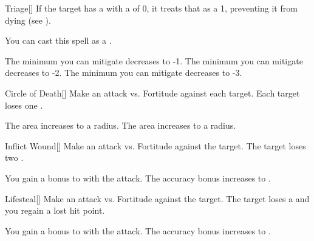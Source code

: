 \lowercase{\hypertarget{spell:Triage}{}}\label{spell:Triage}
\begin{freeability}[Rank 2]{\hypertarget{spell:Triage}{Triage}}[]
If the target has a  with a  of 0, it treats that  as a 1, preventing it from dying (see ).

You can cast this spell as a .

\rankline
{} The minimum  you can mitigate decreases to -1.
 The minimum  you can mitigate decreases to -2.
 The minimum  you can mitigate decreases to -3.

\end{freeability}
\vspace{0.25em}



\lowercase{\hypertarget{spell:Circle of Death}{}}\label{spell:Circle of Death}
\begin{freeability}[Rank 3]{\hypertarget{spell:Circle of Death}{Circle of Death}}[]
Make an attack vs. Fortitude against each target.
\hit Each target loses one .

\rankline
{} The area increases to a \arealarge radius.
 The area increases to a \areahuge radius.

\end{freeability}
\vspace{0.25em}



\lowercase{\hypertarget{spell:Inflict Wound}{}}\label{spell:Inflict Wound}
\begin{freeability}[Rank 3]{\hypertarget{spell:Inflict Wound}{Inflict Wound}}[]
Make an attack vs. Fortitude against the target.
\hit The target loses two .

\rankline
{} You gain a  bonus to  with the attack.
 The accuracy bonus increases to .

\end{freeability}
\vspace{0.25em}



\lowercase{\hypertarget{spell:Lifesteal}{}}\label{spell:Lifesteal}
\begin{freeability}[Rank 3]{\hypertarget{spell:Lifesteal}{Lifesteal}}[]
Make an attack vs. Fortitude against the target.
\hit The target loses a  and you regain a lost hit point.

\rankline
{} You gain a  bonus to  with the attack.
 The accuracy bonus increases to .

\end{freeability}
\vspace{0.25em}



